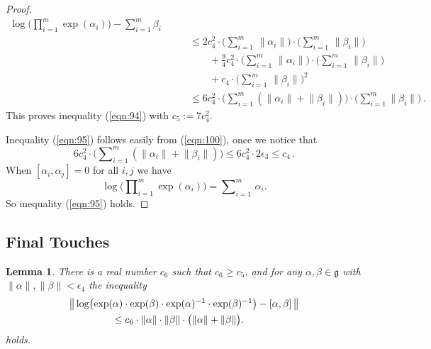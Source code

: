 \documentclass[10pt, a4paper]{amsart}
\newtheorem{lem}[equation]{Lemma}
\theoremstyle{definition}
\numberwithin{equation}{section}
\newcommand{\opn}{\operatorname}
\newcommand{\mfrak}[1]{\mathfrak{#1}}
\newcommand{\smfrac}[2]{{\textstyle \frac{#1}{#2}}}
\newcommand{\norm}[1]{\lVert #1 \rVert}
\newcommand{\Norm}[1]{\bigl\lVert\, #1 \, \bigr\rVert}
\newcommand{\g}{\mfrak{g}}
\begin{document}
\begin{proof}
\begin{equation}
\begin{aligned}
{\opn{log} \bigl(   \prod\nolimits_{i=1}^m \opn{exp}(\alpha_i) \bigr) -
\sum\nolimits_{i=1}^m \beta_i } \\
& \qquad 
\leq 2 c_4^2 \cdot 
\bigl( \sum\nolimits_{i = 1}^m\, \norm{\alpha_i} \bigr)
\cdot 
\bigl( \sum\nolimits_{i = 1}^m\, \norm{\beta_i} \bigr) \\
& \qquad \qquad + 
 \smfrac{9}{4} c_4^2 \cdot 
\bigl( \sum\nolimits_{i = 1}^m\, \norm{\alpha_i} \bigr)
\cdot 
\bigl( \sum\nolimits_{i = 1}^m\, \norm{\beta_i} \bigr) \\
& \qquad \qquad +
c_4 \cdot 
\bigl( \sum\nolimits_{i = 1}^m\, \norm{\beta_i} \bigr)^2 \\
& \qquad 
\leq 6 c_4^2  
\cdot \bigl( \sum\nolimits_{i=1}^m (\norm{\alpha_i}  +
\norm{\beta_i}) \bigr) \cdot 
\bigl( \sum\nolimits_{i=1}^m \norm{\beta_i} \bigr) \, . 
\end{aligned} 
\end{equation}
This proves inequality (\ref{eqn:94}) with
$c_5 := 7 c_4^2$.

Inequality (\ref{eqn:95}) follows easily from (\ref{eqn:100}), once we notice
that
\[ 6 c_4^2  
\cdot \bigl( \sum\nolimits_{i=1}^m (\norm{\alpha_i}  +
\norm{\beta_i}) \bigr) \leq 
6 c_4^2 \cdot 2 \epsilon_3 \leq c_4 \, . \]
When $[\alpha_i, \alpha_j] = 0$ for all $i, j$ we have
\[ \opn{log} \bigl(   \prod\nolimits_{i=1}^m \opn{exp}(\alpha_i) \bigr) =
\sum\nolimits_{i = 1}^m\, \alpha_i . \]
So inequality (\ref{eqn:95}) holds.
\end{proof}

\subsection{Final Touches} \label{subsec:touches}

\begin{lem} \label{lem:34}
There is a real number $c_6$ such that $c_6 \geq c_5$, and for any 
$\alpha, \beta \in \g$ with
$\norm{\alpha}, \norm{\beta} < \epsilon_4$ the inequality
%
\begin{equation} \label{eqn:85}
\begin{aligned}
& \Norm{ \opn{log} \bigl( \opn{exp}(\alpha) \cdot 
\opn{exp}(\beta) \cdot \opn{exp}(\alpha)^{-1} \cdot
\opn{exp}(\beta)^{-1} \bigr) -  
[\alpha, \beta] } \\
& \hspace{10ex}
\leq c_{6} \cdot \norm{\alpha} \cdot \norm{\beta} \cdot 
\bigl( \norm{\alpha} + \norm{\beta} \bigr) .
\end{aligned} 
\end{equation}
holds.
\end{lem}
\end{document}
